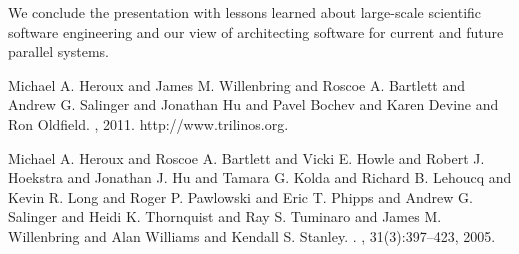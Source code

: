 We conclude the presentation with lessons learned about large-scale scientific software engineering and our view of architecting software for current and future parallel systems.


\begin{thebibliography}{1}

{Michael A. Heroux and James M. Willenbring and Roscoe A. Bartlett and Andrew G. Salinger and Jonathan Hu and Pavel Bochev and Karen Devine and Ron Oldfield}.
, 2011.
\newblock http://www.trilinos.org.

{Michael A. Heroux and Roscoe A. Bartlett and Vicki E. Howle and Robert J. Hoekstra and Jonathan J. Hu and Tamara G. Kolda and Richard B. Lehoucq and Kevin R. Long and Roger P. Pawlowski and Eric T. Phipps and Andrew G. Salinger and Heidi K. Thornquist and Ray S. Tuminaro and James M. Willenbring and Alan Williams and Kendall S. Stanley}.
.
, 31(3):397--423, 2005.

\end{thebibliography}